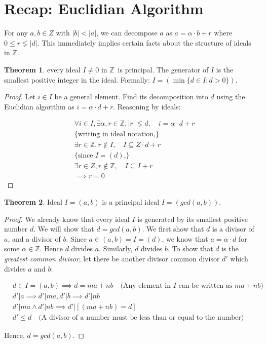 \documentclass{book}
\newcommand{\Z}{\ensuremath{\mathbb{Z}}}
\theoremstyle{definition}
\newtheorem{theorem}{Theorem}
\begin{document}
\section{Recap: Euclidian Algorithm}
For any $a, b \in Z$ with $|b| < |a|$, we can decompose $a$ as
$a = \alpha \cdot b + r$ where $0 \leq r \lneq |d|$. This immediately implies
certain facts about the structure of ideals in \Z. 

\begin{theorem}
every ideal $I \neq 0$ in \Z~is principal. The generator of $I$
is the smallest positive integer in the ideal. Formally: $I = (\min\{ d \in I : d > 0 \})$.
\end{theorem}


\begin{proof}
Let $i \in I$ be a general element. Find its decomposition into $d$ using the
Euclidian algorithm as $i = \alpha \cdot d + r$.
Reasoning by ideals:

\begin{align*}
&\forall i \in I, \exists \alpha, r \in \Z, |r| \lneq d, \quad i = \alpha \cdot d + r \\
&\{ \text{writing in ideal notation,} \} \\
&\exists r \in \Z, r \not \in I,  \quad I \subseteq Z \cdot d + r \\
&\{ \text{since $I = (d)$,} \} \\
&\exists r \in Z, r \not \in \Z, \quad I \subseteq  I + r \\
&\implies r = 0
\end{align*}
\end{proof}

\begin{theorem}
Ideal $I = (a, b)$ is a principal ideal $I = (gcd(a, b))$.
\end{theorem}
\begin{proof}
We already know that every ideal $I$ is generated by its smallest positive number $d$.
We will show that $d = gcd(a, b)$. We first show that $d$ is a divisor of $a$, and
a divisor of $b$.
Since $a \in (a, b) = I = (d)$, we know that $a = \alpha \cdot d$
for some $\alpha \in \Z$. Hence $d$ divides $a$. Similarly, $d$ divides $b$.
To show that $d$ is the \emph{greatest common divisor}, let there be another
divisor common divisor $d'$ which divides $a$ and $b$:

\begin{align*}
& d \in I = (a, b) \implies d = ma + nb \quad \text{(Any element in $I$ can be written as $ma + nb$)} \\
&d' | a \implies d' | m a,d' | b \implies d' | n b \\
&d' | m a \land d' | n b \implies d' | [(m a + n b) = d]\\
& d' \leq d \quad \text{(A divisor of a number must be less than or equal to the number)}
\end{align*}             

Hence, $d = gcd(a, b)$.
\end{proof}
\end{document}
